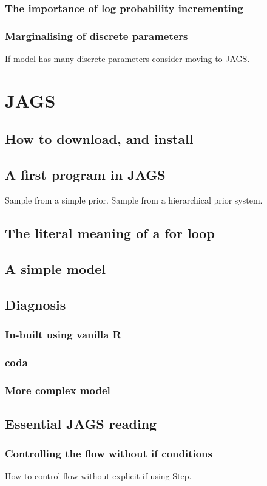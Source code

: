 \documentclass[11pt,fullpage]{book}
\begin{document}
\subsubsection{The importance of log probability incrementing}
\subsubsection{Marginalising of discrete parameters}
If model has many discrete parameters consider moving to JAGS.

\section{JAGS}
\subsection{How to download, and install}
\subsection{A first program in JAGS}
Sample from a simple prior. Sample from a hierarchical prior system.
\subsection{The literal meaning of a for loop}
\subsection{A simple model}
\subsection{Diagnosis}
\subsubsection{In-built using vanilla R}
\subsubsection{coda}
\subsubsection{More complex model}

\subsection{Essential JAGS reading}
\subsubsection{Controlling the flow without if conditions}
How to control flow without explicit if using Step.
\end{document}
